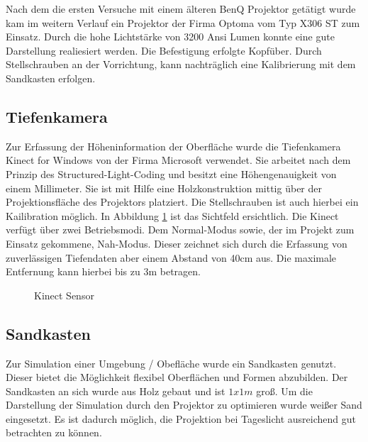 \begin{Spacing}{\mylinespace}
Nach dem die ersten Versuche mit einem älteren BenQ Projektor getätigt wurde kam im weitern Verlauf ein Projektor der Firma Optoma vom Typ X306 ST zum Einsatz. Durch die hohe Lichtstärke von 3200 Ansi Lumen konnte eine gute Darstellung realiesiert werden. Die Befestigung erfolgte Kopfüber. Durch Stellschrauben an der Vorrichtung, kann nachträglich eine Kalibrierung mit dem Sandkasten erfolgen.

\subsection{Tiefenkamera}

Zur Erfassung der Höheninformation der Oberfläche wurde die Tiefenkamera Kinect for Windows von der Firma Microsoft verwendet. Sie arbeitet nach dem Prinzip des Structured-Light-Coding und besitzt eine Höhengenauigkeit von einem Millimeter. Sie ist mit Hilfe eine Holzkonstruktion mittig über der Projektionsfläche des Projektors platziert. Die Stellschrauben ist auch hierbei ein Kailibration möglich. In Abbildung \ref{fig:fov} ist das Sichtfeld ersichtlich. Die Kinect verfügt über zwei Betriebsmodi. Dem Normal-Modus sowie, der im Projekt zum Einsatz gekommene, Nah-Modus. Dieser zeichnet sich durch die Erfassung von zuverlässigen Tiefendaten aber einem Abstand von 40cm aus. Die maximale Entfernung kann hierbei bis zu 3m betragen.

\begin{figure}[h!]
	\centering
	\vspace{0.2cm}
	\caption{Kinect Sensor}
		\label{fig:fov}
\end{figure}

\subsection{Sandkasten}

Zur Simulation einer Umgebung / Obefläche wurde ein Sandkasten genutzt. Dieser bietet die Möglichkeit flexibel Oberflächen und Formen abzubilden. Der Sandkasten an sich wurde aus Holz gebaut und ist $1x1m$ groß. Um die Darstellung der Simulation durch den Projektor zu optimieren wurde weißer Sand eingesetzt. Es ist dadurch möglich, die Projektion bei Tageslicht ausreichend gut betrachten zu können.

\end{Spacing}
\newpage
\clearpage

